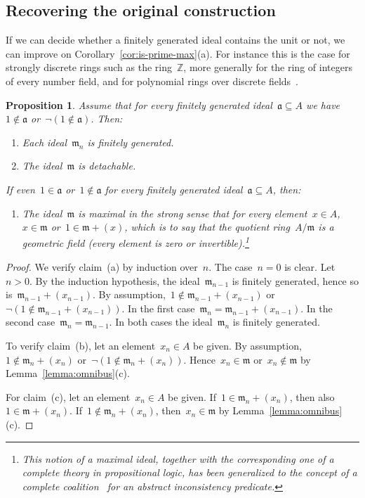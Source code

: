 \documentclass[com,11pt,crcready]{iosart2x}
\theoremstyle{definition}
\theoremstyle{plain}
\newtheorem{proposition}[definition]{Proposition}
\theoremstyle{remark}
\newcommand{\?}{\,{:}\,}
\newcommand{\aaa}{\mathfrak{a}}
\newcommand{\mmm}{\mathfrak{m}}
\newcommand{\ZZ}{\mathbb{Z}}
\renewcommand{\_}{\mathpunct{.}\,}
\begin{document}
\subsection{Recovering the original construction}

If we can decide whether a finitely generated ideal contains the
unit or not, we can improve on Corollary~\ref{cor:is-prime-max}(a). For instance this is the case for
strongly discrete rings such as the ring~$\ZZ$, more generally for the ring of
integers of every number field, and for polynomial rings over discrete
fields~\cite[Theorem~VIII.1.5]{mines-richman-ruitenburg:constructive-algebra}.

\begin{proposition}\label{prop:with-test}
Assume that for every finitely generated ideal~$\aaa \subseteq A$ we have~$1
\not\in \aaa$ or~$\neg(1 \not\in \aaa)$. Then:
\begin{enumerate}
\item[\textnormal{(a)}] Each ideal~$\mmm_n$ is finitely generated.
\item[\textnormal{(b)}] The ideal~$\mmm$ is detachable.
\end{enumerate}
If even~$1 \in \aaa$ or~$1 \not\in \aaa$ for every finitely generated ideal~$\aaa \subseteq
A$, then:
\begin{enumerate}
\addtocounter{enumi}{2}
\item[\textnormal{(c)}] The ideal~$\mmm$ is maximal in the strong sense that for every element~$x
\in A$,~$x \in \mmm$ or~$1 \in \mmm + (x)$, which is to say that the quotient ring~$A/\mmm$ is a
\emph{geometric field} (every element is zero or invertible).\footnote{This
notion of a maximal ideal, together with the corresponding one of a complete
theory in propositional logic, has been generalized to the concept of a
complete coalition~\cite{schuster-wessel:cie2020,schuster-wessel:jacincpred} for an abstract inconsistency
predicate.}
\end{enumerate}
\end{proposition}

\begin{proof}We verify claim~(a) by induction over~$n$. The case~$n = 0$ is
clear. Let~$n > 0$. By the induction hypothesis, the ideal~$\mmm_{n-1}$ is finitely
generated, hence so is~$\mmm_{n-1} + (x_{n-1})$. By assumption,~$1 \not\in \mmm_{n-1} +
(x_{n-1})$ or~$\neg(1 \not\in \mmm_{n-1} + (x_{n-1}))$. In the first
case~$\mmm_n = \mmm_{n-1} + (x_{n-1})$. In the second case~$\mmm_n =
\mmm_{n-1}$. In both cases
the ideal~$\mmm_n$ is finitely generated.

To verify claim~(b), let an element~$x_n \in A$ be given. By assumption,~$1
\not\in \mmm_n + (x_n)$ or~$\neg(1 \not\in \mmm_n + (x_n))$. Hence~$x_n \in
\mmm$ or~$x_n \not\in \mmm$ by Lemma~\ref{lemma:omnibus}(c).

For claim~(c), let an element~$x_n \in A$ be given. If~$1 \in \mmm_n + (x_n)$,
then also~$1 \in \mmm + (x_n)$. If~$1 \not\in \mmm_n + (x_n)$, then~$x_n \in
\mmm$ by Lemma~\ref{lemma:omnibus}(c).
\end{proof}
\end{document}
